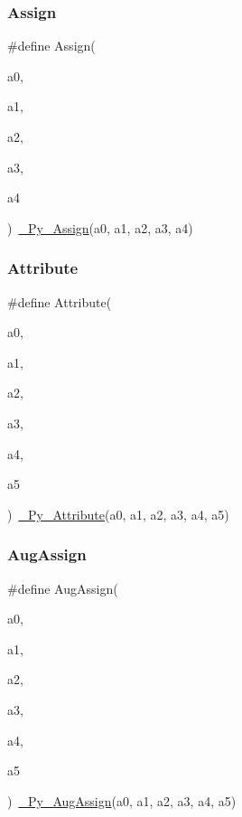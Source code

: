 \mbox{\label{_python-ast_8h_a20ef6778f00445938f70621bb6bcc118}} 
\subsubsection{\texorpdfstring{Assign}{Assign}}
{\footnotesize\ttfamily \#define Assign(\begin{DoxyParamCaption}\item[{}]{a0,  }\item[{}]{a1,  }\item[{}]{a2,  }\item[{}]{a3,  }\item[{}]{a4 }\end{DoxyParamCaption})~\mbox{\hyperlink{_python-ast_8h_ac35a8556d501c8658c9c2439952e50be}{\+\_\+\+Py\+\_\+\+Assign}}(a0, a1, a2, a3, a4)}

\mbox{\label{_python-ast_8h_ac5330959be327b277dd98b3b793b8b12}} 
\subsubsection{\texorpdfstring{Attribute}{Attribute}}
{\footnotesize\ttfamily \#define Attribute(\begin{DoxyParamCaption}\item[{}]{a0,  }\item[{}]{a1,  }\item[{}]{a2,  }\item[{}]{a3,  }\item[{}]{a4,  }\item[{}]{a5 }\end{DoxyParamCaption})~\mbox{\hyperlink{_python-ast_8h_aee0b04133ba38fe51fc7d4195644c5d7}{\+\_\+\+Py\+\_\+\+Attribute}}(a0, a1, a2, a3, a4, a5)}

\mbox{\label{_python-ast_8h_aab09467214841c326f3c20477e9c31af}} 
\subsubsection{\texorpdfstring{AugAssign}{AugAssign}}
{\footnotesize\ttfamily \#define Aug\+Assign(\begin{DoxyParamCaption}\item[{}]{a0,  }\item[{}]{a1,  }\item[{}]{a2,  }\item[{}]{a3,  }\item[{}]{a4,  }\item[{}]{a5 }\end{DoxyParamCaption})~\mbox{\hyperlink{_python-ast_8h_aa5441b53bbc02068d0348142c67109fa}{\+\_\+\+Py\+\_\+\+Aug\+Assign}}(a0, a1, a2, a3, a4, a5)}

